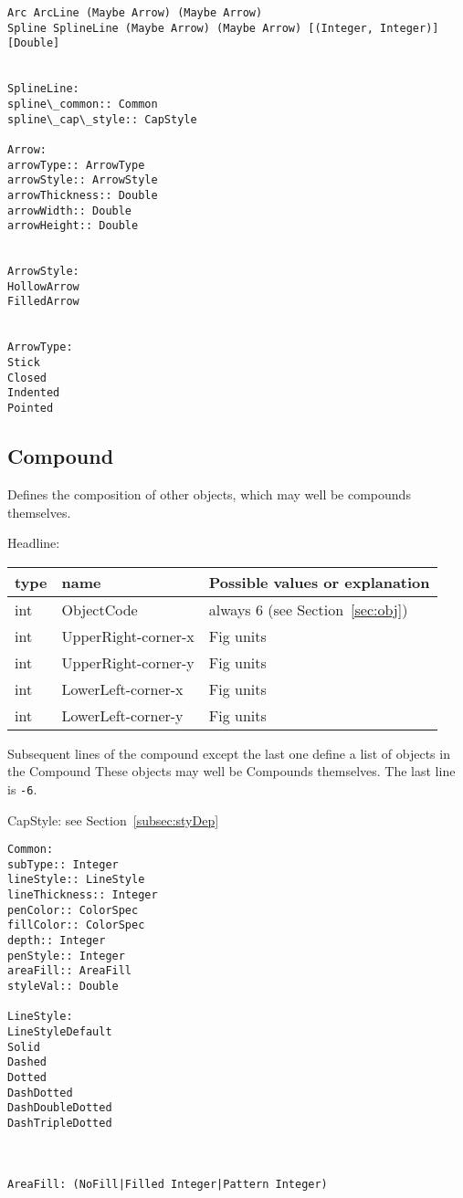 \documentclass[10pt, a4paper]{article}%
\begin{document}
\begin{verbatim}
Arc ArcLine (Maybe Arrow) (Maybe Arrow)	 
Spline SplineLine (Maybe Arrow) (Maybe Arrow) [(Integer, Integer)] [Double]


SplineLine:
spline\_common:: Common
spline\_cap\_style:: CapStyle

Arrow:
arrowType:: ArrowType
arrowStyle:: ArrowStyle
arrowThickness:: Double
arrowWidth:: Double
arrowHeight:: Double


ArrowStyle:
HollowArrow	 
FilledArrow	 


ArrowType:
Stick	 
Closed	 
Indented	 
Pointed	 
\end{verbatim}

 
\subsection{Compound}\label{subsec:compound}

Defines the composition of other objects, 
which may well be compounds themselves. 

\noindent
Headline: \\
%
\begin{tabular}{lll}
\toprule
type & name & Possible values or explanation \\
\midrule
\midrule
int & ObjectCode          & always 6 (see Section~\ref{sec:obj}) \\
int & UpperRight-corner-x & Fig units \\
int & UpperRight-corner-y & Fig units \\
int & LowerLeft-corner-x  & Fig units \\
int & LowerLeft-corner-y  & Fig units \\
\bottomrule
\end{tabular}

Subsequent lines of the compound except the last one 
define a list of objects in the Compound
These objects may well be Compounds themselves. 
The last line is \texttt{-6}. 



CapStyle: see Section~\ref{subsec:styDep}







\begin{verbatim}
Common:
subType:: Integer
lineStyle:: LineStyle
lineThickness:: Integer
penColor:: ColorSpec
fillColor:: ColorSpec
depth:: Integer
penStyle:: Integer
areaFill:: AreaFill
styleVal:: Double

LineStyle:
LineStyleDefault	 
Solid	 
Dashed	 
Dotted	 
DashDotted	 
DashDoubleDotted	 
DashTripleDotted	 



AreaFill: (NoFill|Filled Integer|Pattern Integer)
\end{verbatim}
\end{document}
